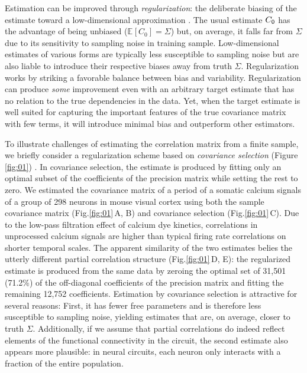 \documentclass[10pt]{article}
\newcommand{\E}[2][]{\mathbb E_{#1}\left[ #2\right]}    %
\begin{document}
Estimation can be improved through \emph{regularization}: the deliberate biasing of the estimate toward a low-dimensional approximation \cite{Schafer:2005,Bickel:2006}.  The usual estimate $C_{\sf 0}$ has the advantage of being unbiased ($\E{C_0}=\Sigma$) but, on average, it falls far from $\Sigma$ due to its sensitivity to sampling noise in training sample.  Low-dimensional estimates of various forms are typically less susceptible to sampling noise but are also liable to introduce their respective biases away from truth $\Sigma$.  Regularization works by striking a favorable balance between bias and variability. Regularization can produce \emph{some} improvement even with an arbitrary target estimate that has no relation to the true dependencies in the data.  Yet, when the target estimate is well suited for capturing the important features of the true covariance matrix with few terms, it will introduce minimal bias and outperform other estimators. 

To illustrate challenges of estimating the correlation matrix from a finite sample, we briefly consider a regularization scheme based on \emph{covariance selection} (Figure \ref{fig:01}) \cite{Dempster:1972}. In covariance selection, the estimate is produced by fitting only an optimal subset of the coefficients of the precision matrix while setting the rest to zero. We estimated the covariance matrix of a period of a somatic calcium signals of a group of 298 neurons in mouse visual cortex using both the sample covariance matrix (Fig.\;\ref{fig:01}\,A, B) and covariance selection (Fig.\;\ref{fig:01}\,C). Due to the low-pass filtration effect of calcium dye kinetics, correlations in unprocessed calcium signals are higher than typical firing rate correlations on shorter temporal scales. The apparent similarity of the two estimates belies the utterly different partial correlation structure (Fig.\;\ref{fig:01}\,D, E): the regularized estimate is produced from the same data by zeroing the optimal set of 31,501 (71.2\%) of the off-diagonal coefficients of the precision matrix and fitting the remaining 12,752 coefficients. Estimation by covariance selection is attractive for several reasons: First, it has fewer free parameters and is therefore less susceptible to sampling noise, yielding estimates that are, on average, closer to truth $\Sigma$. Additionally, if we assume that partial correlations do indeed reflect elements of the functional connectivity in the circuit, the second estimate also appears more plausible: in neural circuits, each neuron only interacts with a fraction of the entire population.
\end{document}
